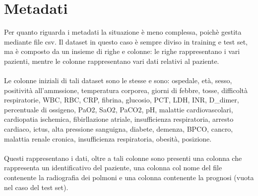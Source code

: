 \section{Metadati}
Per quanto riguarda i metadati la situazione è meno complessa, poichè gestita mediante file csv.
Il dataset in questo caso è sempre diviso in training e test set, ma è composto da un insieme di righe e colonne:
le righe rappresentano i vari pazienti, mentre le colonne rappresentano vari dati relativi al paziente.
\\\\Le colonne iniziali di tali dataset sono le stesse e sono: 
    ospedale,
    età,
    sesso, 
    positività all'ammssione, 
    temperatura corporea,
    giorni di febbre, 
    tosse,
    difficoltà respiratorie,
    WBC,
    RBC,
    CRP,
    fibrina, 
    glucosio, 
    PCT, 
    LDH, 
    INR, 
    D\_dimer, 
    percentuale di ossigeno, 
    PaO2, 
    SaO2, 
    PaCO2, 
    pH, 
    malattie cardiovascolari,
    cardiopatia ischemica,
    fibirllazione atriale,
    insufficienza respiratoria,
    arresto cardiaco,
    ictus,
    alta pressione sanguigna,
    diabete,
    demenza,
    BPCO,
    cancro,
    malattia renale cronica,
    insufficienza respiratoria,
    obesità,
    posizione.
\\\\
Questi rappresentano i dati, oltre a tali colonne sono presenti una colonna che rappresenta un identificativo del paziente, una colonna col nome 
del file contenente la radiografia dei polmoni e una colonna contenente la prognosi (vuota nel caso del test set).



